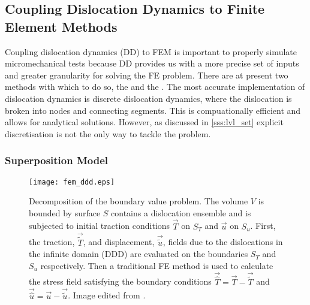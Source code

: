 \subsection{Coupling Dislocation Dynamics to Finite Element Methods}
\label{ss:ddd_fem}
Coupling dislocation dynamics (DD) to FEM is important to properly simulate micromechanical tests because DD provides us with a more precise set of inputs and greater granularity for solving the FE problem. There are at present two methods with which to do so, the  and the . The most accurate implementation of dislocation dynamics is discrete dislocation dynamics, where the dislocation is broken into nodes and connecting segments. This is compuationally efficient and allows for analytical solutions. However, as discussed in \cref{sss:lvl_set} explicit discretisation is not the only way to tackle the problem.

\subsubsection{Superposition Model}
\label{sss:superposition}
\begin{figure}
	\centering
	\texttt{[image: fem\_ddd.eps]}
	\caption[Superposition Model for DDD-FEM coupling.]{Decomposition of the boundary value problem. The volume $ V $ is bounded by surface $ S $ contains a dislocation ensemble and is subjected to initial traction conditions $ \vec{T} $ on $ S_{T} $ and $ \vec{u} $ on $ S_{u} $. First, the traction, $ \vec{\tilde{T}} $, and displacement, $\vec{\tilde{u}}$, fields due to the dislocations in the infinite domain (DDD) are evaluated on the boundaries $ S_{T} $ and $ S_{u} $ respectively. Then a traditional FE method is used to calculate the stress field satisfying the boundary conditions $ \vec{\hat{T}} = \vec{T} - \vec{\tilde{T}} $ and $ \vec{\hat{u}} = \vec{u} - \vec{\tilde{u}} $. Image edited from \cite{analytic_tractions}.}
	\label{f:fem_ddd}
\end{figure}

